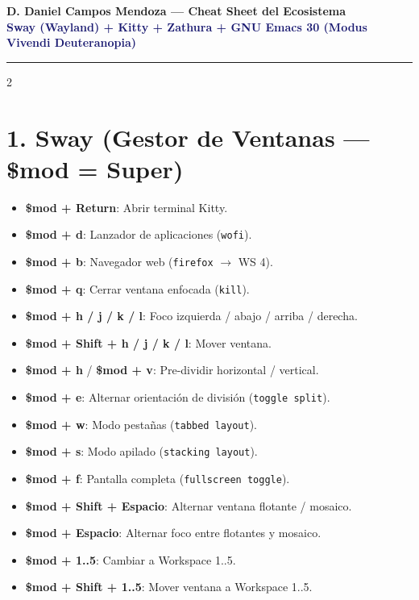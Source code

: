 \documentclass[article,spanish]{apuntes-scr}
\begin{document}
\begin{center}
  {\LARGE\bfseries D. Daniel Campos Mendoza — Cheat Sheet del Ecosistema} \\[0.3em]
  {\large\textcolor{MidnightBlue}{\textbf{Sway (Wayland) + Kitty + Zathura + GNU Emacs 30 (Modus Vivendi Deuteranopia)}}}
\end{center}
\vspace{0.4em}
\hrule
\vspace{0.6em}

\begin{multicols*}{2}

  \section*{1. Sway (Gestor de Ventanas — \$mod = Super)}
  \begin{itemize}[leftmargin=*]
    \item \textbf{\$mod + Return}: Abrir terminal Kitty.
    \item \textbf{\$mod + d}: Lanzador de aplicaciones (\texttt{wofi}).
    \item \textbf{\$mod + b}: Navegador web (\texttt{firefox} $\to$ WS 4).
    \item \textbf{\$mod + q}: Cerrar ventana enfocada (\texttt{kill}).
    \item \textbf{\$mod + h / j / k / l}: Foco izquierda / abajo / arriba / derecha.
    \item \textbf{\$mod + Shift + h / j / k / l}: Mover ventana.
    \item \textbf{\$mod + h} / \textbf{\$mod + v}: Pre-dividir horizontal / vertical.
    \item \textbf{\$mod + e}: Alternar orientación de división (\texttt{toggle split}).
    \item \textbf{\$mod + w}: Modo pestañas (\texttt{tabbed layout}).
    \item \textbf{\$mod + s}: Modo apilado (\texttt{stacking layout}).
    \item \textbf{\$mod + f}: Pantalla completa (\texttt{fullscreen toggle}).
    \item \textbf{\$mod + Shift + Espacio}: Alternar ventana flotante / mosaico.
    \item \textbf{\$mod + Espacio}: Alternar foco entre flotantes y mosaico.
    \item \textbf{\$mod + 1..5}: Cambiar a Workspace 1..5.
    \item \textbf{\$mod + Shift + 1..5}: Mover ventana a Workspace 1..5.

\end{itemize}
\end{multicols*}
\end{document}
